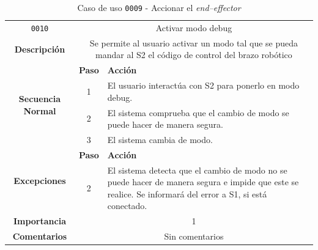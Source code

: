 \begin{table}[H]
    \centering
    \begin{tabularx}{\textwidth}{|c|c|X|}
        \cline{1-3}
        \texttt{0010}        & \multicolumn{2}{c|}{Activar modo debug}                                      
        \\ \cline{1-3}
        \textbf{Descripción} & \multicolumn{2}{m{13cm}|}{Se permite al usuario activar un modo tal que se pueda mandar al \ac{S2} el código de control del brazo robótico}
        \\ \cline{1-3}
        \multirow{4}{*}{\textbf{Secuencia Normal}} & \textbf{Paso} & \textbf{Acción}
        \\ \cline{2-3}                    &   1  & El usuario interactúa con S2 para ponerlo en modo debug.
        \\ \cline{2-3}                    &   2  & El sistema comprueba que el cambio de modo se puede hacer de manera segura.
        \\ \cline{2-3}                    &   3  & El sistema cambia de modo.
        \\ \cline{1-3}
        \multirow{2}{*}{\textbf{Excepciones}} & \textbf{Paso} & \textbf{Acción}
        \\ \cline{2-3}                    &   2  & El sistema detecta que el cambio de modo no se puede hacer de manera segura e impide que este se realice. Se informará del error a \ac{S1}, si está conectado.
        \\ \cline{1-3}
        \textbf{Importancia}                 & \multicolumn{2}{c|}{1}           
        \\ \cline{1-3}
        \textbf{Comentarios}                 & \multicolumn{2}{c|}{Sin comentarios}
        \\ \cline{1-3}
    \end{tabularx}
    \caption{Caso de uso \texttt{0009} - Accionar el \textit{end--effector}}
    \label{tab:CU0010}
    \label{tab:caso_de_uso_activar_modo_debug}
\end{table}

